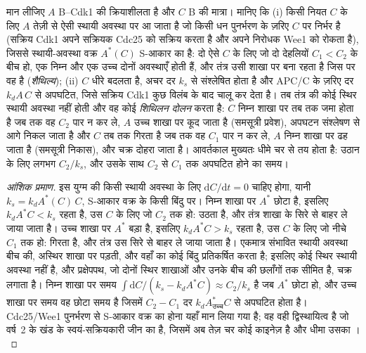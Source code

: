 \begin{theorem}[एक स्विच और एक विलंबित ब्रेक मिलकर दोलक बनाते हैं]\label{thm:b3:cell-cycle-apoptosis:oscillator}
मान लीजिए $A$  B--Cdk1 की क्रियाशीलता है और $C$ 
B की मात्रा। मानिए कि (i) किसी नियत $C$ के लिए $A$ तेज़ी से ऐसी स्थायी
अवस्था पर आ जाता है जो किसी धन पुनर्भरण के ज़रिए $C$ पर निर्भर है
(सक्रिय Cdk1 अपने सक्रियक Cdc25 को सक्रिय करता है और अपने निरोधक Wee1
को रोकता है), जिससे स्थायी-अवस्था वक्र $A^{*}(C)$ S-आकार का है: दो
ऐसे $C$ के लिए जो दो देहलियों $C_{1} < C_{2}$ के बीच हो, एक निम्न और एक उच्च
दोनों अवस्थाएँ होती हैं, और तंत्र उसी शाखा पर बना रहता है जिस पर वह है
(\emph{शैथिल्य}); (ii) $C$ धीरे बदलता है, अचर दर $k_{s}$ से संश्लेषित
होता है और APC/C के ज़रिए दर $k_{d}A\,C$ से अपघटित, जिसे सक्रिय Cdk1
कुछ विलंब के बाद चालू कर देता है। तब तंत्र की कोई स्थिर स्थायी अवस्था
नहीं होती और वह कोई \emph{शिथिलन दोलन} करता है: $C$ निम्न शाखा पर तब तक
जमा होता है जब तक वह $C_{2}$ पार न कर ले, $A$ उच्च शाखा पर कूद जाता है
(समसूत्री प्रवेश), अपघटन संश्लेषण से आगे निकल जाता है और $C$ तब तक
गिरता है जब तक वह $C_{1}$ पार न कर ले, $A$ निम्न शाखा पर ढह जाता है
(समसूत्री निकास), और चक्र दोहरा जाता है। आवर्तकाल मुख्यतः धीमे चर से तय
होता है: उठान के लिए लगभग $C_{2}/k_{s}$, और उसके साथ
$C_{2}$ से $C_{1}$ तक अपघटित होने का समय।
\end{theorem}
\begin{proof}[आंशिक प्रमाण]
इस युग्म की किसी स्थायी अवस्था के लिए $\mathrm{d}C/\mathrm{d}t = 0$
चाहिए होगा, यानी $k_{s} = k_{d}A^{*}(C)\,C$, S-आकार वक्र के किसी बिंदु
पर। निम्न शाखा पर $A^{*}$ छोटा है, इसलिए
$k_{d}A^{*}C < k_{s}$ रहता है, उस $C$ के लिए जो $C_{2}$ तक हो:  उठता है, और तंत्र शाखा के
सिरे से बाहर ले जाया जाता है। उच्च शाखा पर $A^{*}$ बड़ा है, इसलिए
$k_{d}A^{*}C > k_{s}$ रहता है, उस $C$ के लिए जो नीचे $C_{1}$ तक हो: 
गिरता है, और तंत्र उस सिरे से बाहर ले जाया जाता है। एकमात्र संभावित
स्थायी अवस्था बीच की, अस्थिर शाखा पर पड़ती, और वहाँ का कोई बिंदु
प्रतिकर्षित करता है; इसलिए कोई स्थिर स्थायी अवस्था नहीं है, और
प्रक्षेपपथ, जो दोनों स्थिर शाखाओं और उनके बीच की छलाँगों तक सीमित है,
चक्र लगाता है। निम्न शाखा पर समय
$\int \mathrm{d}C/(k_{s} - k_{d}A^{*}C) \approx C_{2}/k_{s}$ है जब
$A^{*}$ छोटा हो, और उच्च शाखा पर समय वह छोटा समय है जिसमें
$C_{2} - C_{1}$ दर $k_{d}A^{*}_{\text{उच्च}}C$ से अपघटित होता है।
Cdc25/Wee1 पुनर्भरण से S-आकार वक्र का होना यहाँ मान लिया गया है; वह
वही द्विस्थायित्व है जो वर्ष~2 के खंड के स्वयं-सक्रियकारी जीन का है,
जिसमें अब तेज़ चर कोई काइनेज़ है और धीमा उसका ।
\end{proof}

